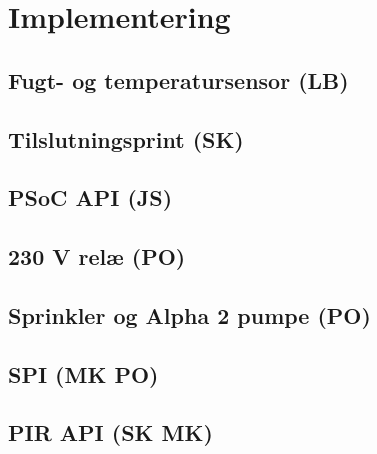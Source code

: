\chapter{Implementering}


\section{Fugt- og temperatursensor (LB)}


\section{Tilslutningsprint (SK)}


\section{PSoC API (JS)}


\section{230 V relæ (PO)}


\section{Sprinkler og Alpha 2 pumpe (PO)}


\newpage
\section{SPI (MK PO)}


\section{PIR API (SK MK)}




